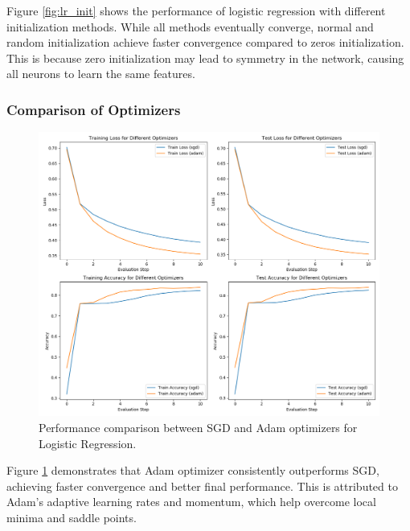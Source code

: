 \documentclass[journal, a4paper]{IEEEtran}
\begin{document}
Figure \ref{fig:lr_init} shows the performance of logistic regression with different initialization methods. While all methods eventually converge, normal and random initialization achieve faster convergence compared to zeros initialization. This is because zero initialization may lead to symmetry in the network, causing all neurons to learn the same features.

\subsubsection{Comparison of Optimizers}
\begin{figure}[htbp]
\centering
\includegraphics[width=\linewidth]{logistic_regression_optimizers.png}
\caption{Performance comparison between SGD and Adam optimizers for Logistic Regression.}
\label{fig:lr_opt}
\end{figure}

Figure \ref{fig:lr_opt} demonstrates that Adam optimizer consistently outperforms SGD, achieving faster convergence and better final performance. This is attributed to Adam's adaptive learning rates and momentum, which help overcome local minima and saddle points.
\end{document}
